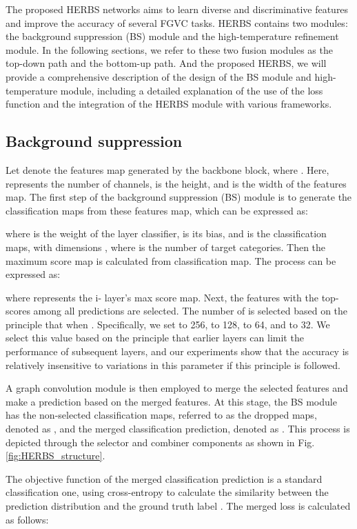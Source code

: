 \documentclass[journal]{IEEEtran}
\begin{document}
The proposed HERBS networks aims to learn diverse and discriminative features and improve the accuracy of several FGVC tasks. HERBS contains two modules: the background suppression (BS) module and the high-temperature refinement module. In the following sections, we refer to these two fusion modules as the top-down path and the bottom-up path. And the proposed HERBS, we will provide a comprehensive description of the design of the BS module and high-temperature module, including a detailed explanation of the use of the loss function and the integration of the HERBS module with various frameworks.

\subsection{Background suppression}

Let  denote the features map generated by the  backbone block, where . Here,  represents the number of channels,  is the height, and  is the width of the features map. The first step of the background suppression (BS) module is to generate the classification maps from these features map, which can be expressed as:

where  is the weight of the  layer classifier,  is its bias, and  is the classification maps, with dimensions , where  is the number of target categories. Then the maximum score map is calculated from classification map. The process can be expressed as:

where  represents the i- layer's max score map. Next, the features with the top- scores among all predictions are selected. The number of  is selected based on the principle that  when . Specifically, we set  to 256,  to 128,  to 64, and  to 32. We select this value based on the principle that earlier layers can limit the performance of subsequent layers, and our experiments show that the accuracy is relatively insensitive to variations in this parameter if this principle is followed.

A graph convolution module is then employed to merge the selected features and make a prediction based on the merged features. At this stage, the BS module has the non-selected classification maps, referred to as the dropped maps, denoted as , and the merged classification prediction, denoted as . This process is depicted through the selector and combiner components as shown in Fig.\ref{fig:HERBS_structure}. 

The objective function of the merged classification prediction is a standard classification one, using cross-entropy to calculate the similarity between the prediction distribution  and the ground truth label . The merged loss is calculated as follows:
\end{document}
